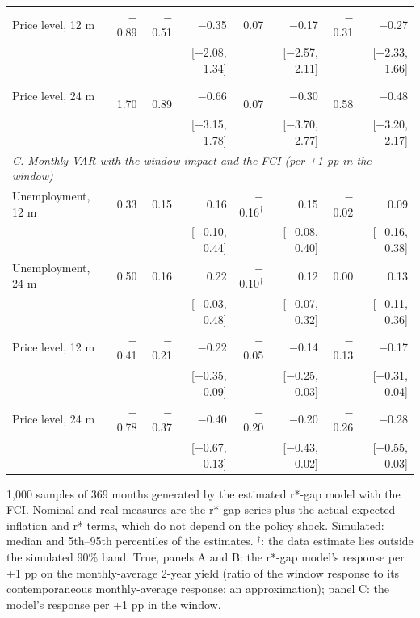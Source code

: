 \begin{table}[H]
\begin{tabular}{lrrrrrrr}
\quad Price level, 12 m & $-$0.89 & $-$0.51 & $-$0.35 & 0.07 & $-$0.17 & $-$0.31 & $-$0.27\\
 &  &  & {\scriptsize [$-$2.08, 1.34]} &  & {\scriptsize [$-$2.57, 2.11]} &  & {\scriptsize [$-$2.33, 1.66]}\\
\quad Price level, 24 m & $-$1.70 & $-$0.89 & $-$0.66 & $-$0.07 & $-$0.30 & $-$0.58 & $-$0.48\\
 &  &  & {\scriptsize [$-$3.15, 1.78]} &  & {\scriptsize [$-$3.70, 2.77]} &  & {\scriptsize [$-$3.20, 2.17]}\\
\multicolumn{8}{l}{\textit{C. Monthly VAR with the window impact and the FCI (per +1 pp in the window)}}\\
\quad Unemployment, 12 m & 0.33 & 0.15 & 0.16 & $-$0.16$^{\dagger}$ & 0.15 & $-$0.02 & 0.09\\
 &  &  & {\scriptsize [$-$0.10, 0.44]} &  & {\scriptsize [$-$0.08, 0.40]} &  & {\scriptsize [$-$0.16, 0.38]}\\
\quad Unemployment, 24 m & 0.50 & 0.16 & 0.22 & $-$0.10$^{\dagger}$ & 0.12 & 0.00 & 0.13\\
 &  &  & {\scriptsize [$-$0.03, 0.48]} &  & {\scriptsize [$-$0.07, 0.32]} &  & {\scriptsize [$-$0.11, 0.36]}\\
\quad Price level, 12 m & $-$0.41 & $-$0.21 & $-$0.22 & $-$0.05 & $-$0.14 & $-$0.13 & $-$0.17\\
 &  &  & {\scriptsize [$-$0.35, $-$0.09]} &  & {\scriptsize [$-$0.25, $-$0.03]} &  & {\scriptsize [$-$0.31, $-$0.04]}\\
\quad Price level, 24 m & $-$0.78 & $-$0.37 & $-$0.40 & $-$0.20 & $-$0.20 & $-$0.26 & $-$0.28\\
 &  &  & {\scriptsize [$-$0.67, $-$0.13]} &  & {\scriptsize [$-$0.43, 0.02]} &  & {\scriptsize [$-$0.55, $-$0.03]}\\
\bottomrule\end{tabular}
\par\smallskip\parbox{0.96\linewidth}{\scriptsize 1,000 samples of 369 months generated by the estimated r*-gap model with the FCI. Nominal and real measures are the r*-gap series plus the actual expected-inflation and r* terms, which do not depend on the policy shock. Simulated: median and 5th--95th percentiles of the estimates. $^{\dagger}$: the data estimate lies outside the simulated 90\% band. True, panels A and B: the r*-gap model's response per +1 pp on the monthly-average 2-year yield (ratio of the window response to its contemporaneous monthly-average response; an approximation); panel C: the model's response per +1 pp in the window.}
\end{table}
